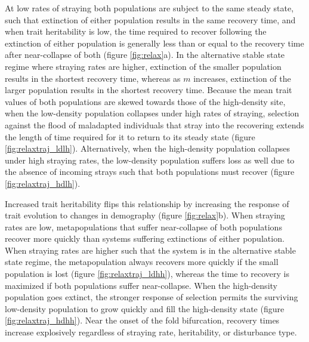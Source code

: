 \documentclass[twocolumn,preprintnumbers,amsmath,amssymb,superscriptaddress]{revtex4}
\begin{document}
At low rates of straying both populations are subject to the same steady state, such that extinction of either population results in the same recovery time, and when trait heritability is low, the time required to recover following the extinction of either population is generally less than or equal to the recovery time after near-collapse of both (figure \ref{fig:relax}a).
In the alternative stable state regime where straying rates are higher, extinction of the smaller population results in the shortest recovery time, whereas as $m$ increases, extinction of the larger population results in the shortest recovery time.
Because the mean trait values of both populations are skewed towards those of the high-density site, when the low-density population collapses under high rates of straying, selection against the flood of maladapted individuals that stray into the recovering extends the length of time required for it to return to its steady state (figure \ref{fig:relaxtraj_ldlh}).
Alternatively, when the high-density population collapses under high straying rates, the low-density population suffers loss as well due to the absence of incoming strays such that both populations must recover (figure \ref{fig:relaxtraj_hdlh}).

Increased trait heritability flips this relationship by increasing the response of trait evolution to changes in demography (figure \ref{fig:relax}b).
When straying rates are low, metapopulations that suffer near-collapse of both populations recover more quickly than systems suffering extinctions of either population.
When straying rates are higher such that the system is in the alternative stable state regime, the metapopulation always recovers more quickly if the small population is lost (figure \ref{fig:relaxtraj_ldhh}), whereas the time to recovery is maximized if both populations suffer near-collapse.
When the high-density population goes extinct, the stronger response of selection permits the surviving low-density population to grow quickly and fill the high-density state (figure \ref{fig:relaxtraj_hdhh}).
Near the onset of the fold bifurcation, recovery times increase explosively regardless of straying rate, heritability, or disturbance type.
\end{document}
